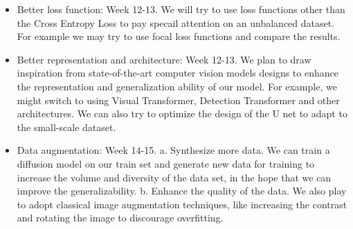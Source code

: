 \documentclass{article}
\begin{document}
\begin{itemize}
    \item Better loss function: Week 12-13. 
    We will try to use loss functions other than the Cross Entropy Loss to pay specail attention on an unbalanced dataset. 
    For example we may try to use focal loss functions and compare the results.     
    \item Better representation and architecture:  Week 12-13. 
    We plan to draw inspiration from state-of-the-art computer vision models designs to enhance the representation and generalization 
    ability of our model. For example, we might switch to using Visual Transformer, Detection Transformer and other architectures. 
    We can also try to optimize the design of the U net to adapt to the small-scale dataset. 
    \item Data augmentation: Week 14-15. 
    a. Synthesize more data. We can train a diffusion model on our train set and generate new data for training to increase the volume and diversity of the data set, in the hope that 
    we can improve the generalizability.   
    b. Enhance the quality of the data. We also play to adopt classical image augmentation techniques, like increasing the contrast 
    and rotating the image to discourage overfitting.
\end{itemize}







\newpage
\onecolumn
\end{document}
